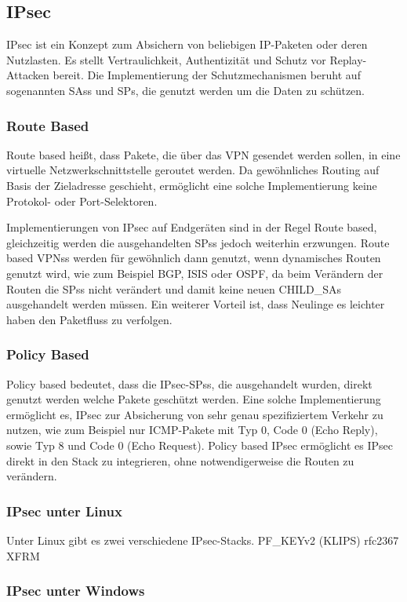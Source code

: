 \subsection{IPsec}
\ac{IPsec} ist ein Konzept zum Absichern von beliebigen \ac{IP}-Paketen oder deren Nutzlasten.
Es stellt Vertraulichkeit, Authentizität und Schutz vor Replay-Attacken bereit.
Die Implementierung der Schutzmechanismen beruht auf sogenannten \acp{SAs} und \ac{SPs},
die genutzt werden um die Daten zu schützen.
\subsubsection{Route Based}
Route based heißt, dass Pakete, die über das VPN
gesendet werden sollen, in eine virtuelle Netzwerkschnittstelle geroutet werden.
Da gewöhnliches Routing auf Basis der Zieladresse geschieht, ermöglicht eine solche Implementierung
keine Protokol- oder Port-Selektoren.

Implementierungen von IPsec auf Endgeräten sind in der Regel Route based, gleichzeitig werden
die ausgehandelten \acp{SPs} jedoch weiterhin erzwungen.
Route based \acp{VPNs} werden für gewöhnlich dann genutzt, wenn dynamisches Routen genutzt wird,
wie zum Beispiel \ac{BGP}, \ac{ISIS} oder \ac{OSPF}, da beim Verändern der Routen die \acp{SPs} nicht verändert
und damit keine neuen CHILD\_SAs ausgehandelt werden müssen. Ein weiterer Vorteil ist, dass Neulinge es leichter haben
den Paketfluss zu verfolgen.
\subsubsection{Policy Based}
Policy based bedeutet, dass die \ac{IPsec}-\acp{SPs}, die ausgehandelt wurden, direkt genutzt werden welche Pakete geschützt werden.
Eine solche Implementierung ermöglicht es, \ac{IPsec} zur Absicherung von sehr genau spezifiziertem
Verkehr zu nutzen, wie zum Beispiel nur \ac{ICMP}-Pakete mit Typ 0, Code 0 (Echo Reply), sowie Typ 8 und Code 0 (Echo Request).
Policy based \ac{IPsec} ermöglicht es \ac{IPsec} direkt in den Stack zu integrieren, ohne notwendigerweise die Routen zu verändern.
\subsubsection{IPsec unter Linux}
Unter Linux gibt es zwei verschiedene \ac{IPsec}-Stacks. 
PF\_KEYv2 (KLIPS) rfc2367
XFRM
\subsubsection{IPsec unter Windows}
